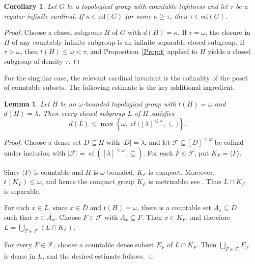 \documentclass[12pt]{amsart}
\newtheorem{corollary}[theorem]{Corollary}
\newtheorem{lemma}[theorem]{Lemma}
\theoremstyle{definition}
\numberwithin{equation}{section}
\theoremstyle{remark}
\def\cd{\mathrm{cd}}
\begin{document}
\begin{corollary}\label{cor:regular-spectrum}
Let $G$ be a topological group with countable tightness and let $\tau$ be a
regular infinite cardinal. If $\kappa\in\cd(G)$ for some $\kappa\geq\tau$,
then $\tau\in\cd(G)$.
\end{corollary}

\begin{proof}
Choose a closed subgroup $H$ of $G$ with $d(H)=\kappa$. If $\tau=\omega$,
the closure in $H$ of any countably infinite subgroup is an infinite
separable closed subgroup. If $\tau>\omega$, then
$t(H)\leq\omega<\tau$, and Proposition~\ref{Prop:t} applied to $H$
yields a closed subgroup of density $\tau$.
\end{proof}

For the singular case, the relevant cardinal invariant is the cofinality
of the poset of countable subsets. The following estimate is the key
additional ingredient.

\begin{lemma}\label{lem:closed-density-bound}
Let $H$ be an $\omega$-bounded topological group with $t(H)=\omega$ and
$d(H)=\lambda$. Then every closed subgroup $L$ of $H$ satisfies
\[
d(L)\leq
\max\left\{\omega,
\operatorname{cf}\bigl([\lambda]^{\leq\omega},\subseteq\bigr)
\right\}.
\]
\end{lemma}

\begin{proof}
Choose a dense set $D\subseteq H$ with $|D|=\lambda$, and let
$\mathcal F\subseteq[D]^{\leq\omega}$ be cofinal under inclusion with
$|\mathcal F|
=\operatorname{cf}([\lambda]^{\leq\omega},\subseteq)$.
For each $F\in\mathcal F$, put
$K_F=\overline{\langle F\rangle}$.

Since $\langle F\rangle$ is countable and $H$ is $\omega$-bounded,
$K_F$ is compact. Moreover, $t(K_F)\leq\omega$, and hence the compact
group $K_F$ is metrizable; see \cite{Ismail}. Thus
$L\cap K_F$ is separable.

For each $x\in L$, since $x\in\overline D$ and $t(H)=\omega$, there is a
countable set $A_x\subseteq D$ such that $x\in\overline{A_x}$. Choose
$F\in\mathcal F$ with $A_x\subseteq F$. Then $x\in K_F$, and therefore
$L=\bigcup_{F\in\mathcal F}(L\cap K_F)$.

For every $F\in\mathcal F$, choose a countable dense subset $E_F$ of
$L\cap K_F$. Then $\bigcup_{F\in\mathcal F}E_F$ is dense in $L$, and
the desired estimate follows.
\end{proof}
\end{document}
